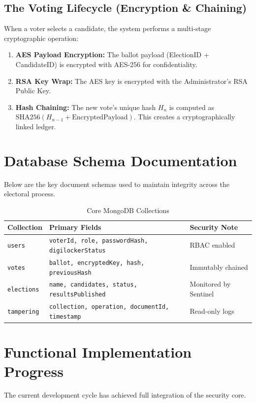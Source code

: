 \documentclass[11pt,a4paper]{article}
\begin{document}
\subsection{The Voting Lifecycle (Encryption & Chaining)}
When a voter selects a candidate, the system performs a multi-stage cryptographic operation:
\begin{enumerate}
    \item \textbf{AES Payload Encryption:} The ballot payload (ElectionID + CandidateID) is encrypted with AES-256 for confidentiality.
    \item \textbf{RSA Key Wrap:} The AES key is encrypted with the Administrator's RSA Public Key.
    \item \textbf{Hash Chaining:} The new vote's unique hash $H_n$ is computed as $\text{SHA256}(H_{n-1} + \text{EncryptedPayload})$. This creates a cryptographically linked ledger.
\end{enumerate}

\section{Database Schema Documentation}
Below are the key document schemas used to maintain integrity across the electoral process.

\begin{table}[h!]
    \centering
    \small
    \caption{Core MongoDB Collections}
    \begin{tabular}{@{}lll@{}}
        \toprule
        \textbf{Collection} & \textbf{Primary Fields} & \textbf{Security Note} \\ \midrule
        \texttt{users} & \texttt{voterId, role, passwordHash, digilockerStatus} & RBAC enabled \\
        \texttt{votes} & \texttt{ballot, encryptedKey, hash, previousHash} & Immutably chained \\
        \texttt{elections} & \texttt{name, candidates, status, resultsPublished} & Monitored by Sentinel \\
        \texttt{tampering} & \texttt{collection, operation, documentId, timestamp} & Read-only logs \\
        \bottomrule
    \end{tabular}
\end{table}

\section{Functional Implementation Progress}
The current development cycle has achieved full integration of the security core.
\end{document}
